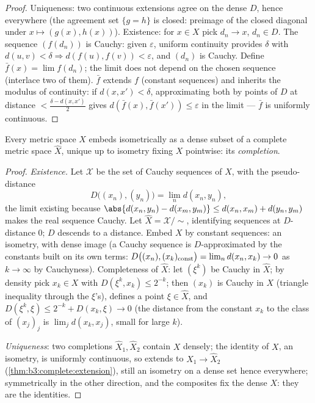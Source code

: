 \begin{proof}
Uniqueness: two continuous extensions agree on the dense $D$,
hence everywhere (the agreement set $\{g = h\}$ is closed:
preimage of the closed diagonal under $x\mapsto(g(x), h(x))$).
Existence: for $x \in X$ pick $d_n \to x$, $d_n \in D$. The
sequence $(f(d_n))$ is Cauchy: given $\varepsilon$, uniform
continuity provides $\delta$ with $d(u,v) < \delta \Rightarrow
d(f(u), f(v)) < \varepsilon$, and $(d_n)$ is Cauchy. Define
$\bar f(x) = \lim f(d_n)$; the limit does not depend on the
chosen sequence (interlace two of them). $\bar f$ extends $f$
(constant sequences) and inherits the modulus of continuity: if
$d(x, x') < \delta$, approximating both by points of $D$ at
distance $< \frac{\delta - d(x,x')}2$ gives $d(\bar f(x), \bar
f(x')) \leq \varepsilon$ in the limit --- $\bar f$ is uniformly
continuous.
\end{proof}

\begin{theorem}[Completion]\label{thm:b3:complete:completion}
Every metric space $X$ embeds isometrically as a dense subset of
a complete metric space $\hat X$, unique up to isometry fixing
$X$ pointwise: its \emph{completion}.
\end{theorem}

\begin{proof}
\emph{Existence.} Let $\mathcal X$ be the set of Cauchy
sequences of $X$, with the pseudo-distance
\[
D\bigl((x_n), (y_n)\bigr) = \lim_n d(x_n, y_n),
\]
the limit existing because $\abs{d(x_n, y_n) - d(x_m, y_m)}
\leq d(x_n, x_m) + d(y_n, y_m)$ makes the real sequence
Cauchy. Let $\hat X = \mathcal X/{\sim}$,
identifying sequences at $D$-distance $0$; $D$ descends to a
distance. Embed $X$ by constant sequences: an isometry, with
dense image (a Cauchy sequence is $D$-approximated by the
constants built on its own terms: $D\bigl((x_n), (x_k)_{\rm
const}\bigr) = \lim_n d(x_n, x_k) \to 0$ as $k \to \infty$ by
Cauchyness). Completeness of $\hat X$: let $(\xi^k)$ be Cauchy
in $\hat X$; by density pick $x_k \in X$ with $D(\xi^k, x_k)
\leq 2^{-k}$; then $(x_k)$ is Cauchy in $X$ (triangle
inequality through the $\xi$'s), defines a point $\xi \in \hat
X$, and $D(\xi^k, \xi) \leq 2^{-k} + D(x_k, \xi) \to 0$ (the
distance from the constant $x_k$ to the class of $(x_j)_j$ is
$\lim_j d(x_k, x_j)$, small for large $k$).

\emph{Uniqueness}: two completions $\hat X_1, \hat X_2$ contain
$X$ densely; the identity of $X$, an isometry, is uniformly
continuous, so extends to $\hat X_1 \to \hat X_2$
(\cref{thm:b3:complete:extension}), still an isometry on a dense
set hence everywhere; symmetrically in the other direction, and
the composites fix the dense $X$: they are the identities.
\end{proof}

